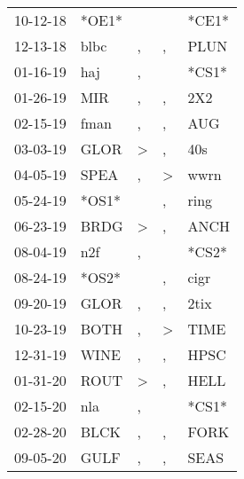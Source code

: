 \begin{supertabular}{lllll}
 10-12-18 &  *OE1* &                  &               &  *CE1* \\
 12-13-18 &   blbc &                , &             , &   PLUN \\
 01-16-19 &    haj &                , &               &  *CS1* \\
 01-26-19 &    MIR &                , &             , &    2X2 \\
 02-15-19 &   fman &                , &             , &    AUG \\
 03-03-19 &   GLOR &     \textgreater &             , &    40s \\
 04-05-19 &   SPEA &                , &  \textgreater &   wwrn \\
 05-24-19 &  *OS1* &                  &             , &   ring \\
 06-23-19 &   BRDG &     \textgreater &             , &   ANCH \\
 08-04-19 &    n2f &                , &               &  *CS2* \\
 08-24-19 &  *OS2* &                  &             , &   cigr \\
 09-20-19 &   GLOR &                , &             , &   2tix \\
 10-23-19 &   BOTH &                , &  \textgreater &   TIME \\
 12-31-19 &   WINE &                , &             , &   HPSC \\
 01-31-20 &   ROUT &     \textgreater &             , &   HELL \\
 02-15-20 &    nla &                , &               &  *CS1* \\
 02-28-20 &   BLCK &                , &             , &   FORK \\
 09-05-20 &   GULF &                , &             , &   SEAS \\
\end{supertabular}
